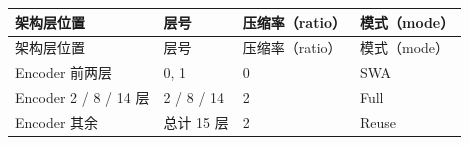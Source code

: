 \documentclass[zihao=false,fontset=windows]{ctexart}
\newcommand{\incode}[1]{\colorbox{inlinebg}{\ttfamily\small #1}}
\begin{document}
\begin{longtable}{|>{\raggedright\arraybackslash}p{3.28cm}|>{\raggedright\arraybackslash}p{3.28cm}|>{\raggedright\arraybackslash}p{3.28cm}|>{\raggedright\arraybackslash}p{3.28cm}|}\hline
\rowcolor{tableHead} 
架构层位置\par
 & 
层号\par
 & 
压缩率（\incode{ratio}）\par
 & 
模式（\incode{mode}）\par
 \\ \hline
\endfirsthead
\hline\rowcolor{tableHead} 
架构层位置\par
 & 
层号\par
 & 
压缩率（\incode{ratio}）\par
 & 
模式（\incode{mode}）\par
 \\ \hline
\endhead

Encoder 前两层\par
 & 
0, 1\par
 & 
0\par
 & 
SWA\par
 \\ \hline

Encoder 2 / 8 / 14 层\par
 & 
2 / 8 / 14\par
 & 
2\par
 & 
Full\par
 \\ \hline

Encoder 其余\par
 & 
总计 15 层\par
 & 
2\par
 & 
Reuse\par
 \\ \hline


\end{longtable}
\end{document}
